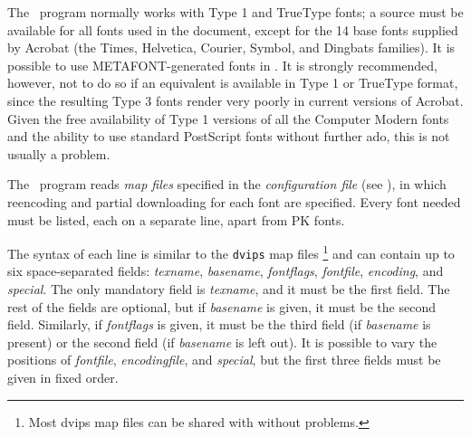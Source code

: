 
The \pdfTEX\  program normally works with Type 1 and TrueType fonts; a
source must be available for all fonts used in the document, except for
the 14 base fonts supplied by Acrobat (the Times, Helvetica, Courier,
Symbol, and Dingbats families). It is possible to use METAFONT-generated
fonts in \pdfTEX. It is strongly recommended, however, not to do so if
an equivalent is available in Type 1 or TrueType format, since the
resulting Type 3 fonts render very poorly in current versions of
Acrobat. Given the free availability of Type 1 versions of all the
Computer Modern fonts and the ability to use standard PostScript fonts
without further ado, this is not usually a problem. 



The \pdfTEX\  program reads \emph{map files} specified in the
\emph{configuration file} (see
), in which reencoding and
partial downloading for each font are specified. Every font needed must
be listed, each on a separate line, apart from PK fonts. 

The syntax of each line is similar to the \verb|dvips| map files \footnote{
Most dvips map files can be shared with \pdfTEX without problems. 
} 
and can contain up to six space-separated fields: \emph{texname},
\emph{basename}, \emph{fontflags}, \emph{fontfile}, \emph{encoding}, and
\emph{special}.  The only mandatory field is \emph{texname}, and it must
be the first field. The rest of the fields are optional, but if
\emph{basename} is given, it must be the second field. Similarly, if
\emph{fontflags} is given, it must be the third field (if
\emph{basename} is present) or the second field (if \emph{basename} is
left out). It is possible to vary the positions of \emph{fontfile},
\emph{encodingfile}, and \emph{special}, but the first three fields must
be given in fixed order. 

